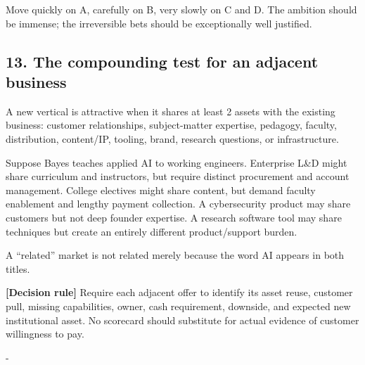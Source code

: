 Move quickly on A, carefully on B, very slowly on C and D. The ambition should be immense; the irreversible bets should be exceptionally well justified.

\subsection{13. The compounding test for an adjacent business}

A new vertical is attractive when it shares at least 2 assets with the existing business: customer relationships, subject-matter expertise, pedagogy, faculty, distribution, content/\allowbreak IP, tooling, brand, research questions, or infrastructure.

Suppose Bayes teaches applied AI to working engineers. Enterprise L\&D might share curriculum and instructors, but require distinct procurement and account management. College electives might share content, but demand faculty enablement and lengthy payment collection. A cybersecurity product may share customers but not deep founder expertise. A research software tool may share techniques but create an entirely different product/\allowbreak support burden.

A ``related'' market is not related merely because the word AI appears in both titles.

\textbf{\textbf{[Decision rule]}} Require each adjacent offer to identify its asset reuse, customer pull, missing capabilities, owner, cash requirement, downside, and expected new institutional asset. No scorecard should substitute for actual evidence of customer willingness to pay.

-


